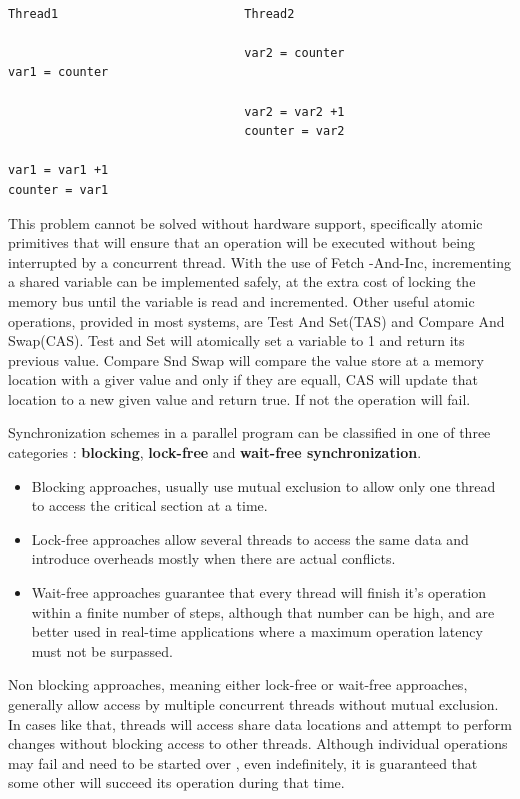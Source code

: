 \begin{lstlisting}[caption={ Inconsistencies caused by the lack of syncronization}]
	
Thread1                          Thread2

                                 var2 = counter
var1 = counter	

                                 var2 = var2 +1
                                 counter = var2

var1 = var1 +1
counter = var1

\end{lstlisting}

This problem cannot be solved without hardware support, specifically atomic primitives that will ensure that an operation will be executed without being interrupted by a concurrent thread.  With the use of Fetch -And-Inc, incrementing a shared variable can be implemented safely, at the extra cost of locking  the memory bus until the variable is read and incremented. Other useful atomic operations, provided in most systems, are Test And Set(TAS) and Compare And Swap(CAS). Test and Set will atomically set a variable to 1 and return its previous value. Compare Snd Swap will compare the value store at a memory location with a giver value and only if they are equall, CAS will update that location to a new given value and return true. If not the operation will fail.

Synchronization schemes in a parallel program  can be classified in one of three categories : \textbf{blocking}, \textbf{lock-free} and \textbf{wait-free synchronization}.

\begin{itemize}
\item Blocking approaches, usually use mutual exclusion to allow only one thread to access the critical section at a time. 

\item Lock-free approaches allow several threads to access the same data and introduce overheads mostly when there are actual conflicts. 

\item Wait-free approaches guarantee that every thread will finish it's operation within a finite number of steps, although that number can be high, and are better used in real-time applications where a maximum operation latency must not be surpassed. 
\end{itemize}

Non blocking approaches, meaning either lock-free or wait-free approaches, generally allow access by multiple concurrent threads without mutual exclusion. In cases like that, threads will access share data locations and attempt to perform changes without blocking access to other threads. Although individual operations may fail and need to be started over , even indefinitely, it is guaranteed that some other will succeed its operation during that time. %

